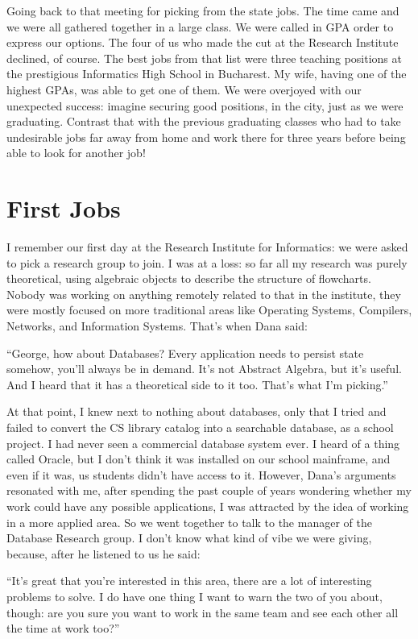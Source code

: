 \documentclass[12pt]{book}
\begin{document}
Going back to that meeting for picking from the state jobs. The time
came and we were all gathered together in a large class. We were called
in GPA order to express our options. The four of us who made the cut at
the Research Institute declined, of course. The best jobs from that list
were three teaching positions at the prestigious Informatics High School
in Bucharest. My wife, having one of the highest GPAs, was able to get
one of them. We were overjoyed with our unexpected success: imagine
securing good positions, in the city, just as we were graduating.
Contrast that with the previous graduating classes who had to take
undesirable jobs far away from home and work there for three years
before being able to look for another job!


\section{First Jobs}

I remember our first day at the Research Institute for Informatics: we
were asked to pick a research group to join. I was at a loss: so far all
my research was purely theoretical, using algebraic objects to describe
the structure of flowcharts. Nobody was working on anything remotely
related to that in the institute, they were mostly focused on more
traditional areas like Operating Systems, Compilers, Networks, and
Information Systems. That's when Dana said:

``George, how about Databases? Every application needs to persist state
somehow, you'll always be in demand. It's not Abstract Algebra, but it's
useful. And I heard that it has a theoretical side to it too. That's
what I'm picking.''

At that point, I knew next to nothing about databases, only that I tried
and failed to convert the CS library catalog into a searchable database,
as a school project. I had never seen a commercial database system ever.
I heard of a thing called Oracle, but I don't think it was installed on
our school mainframe, and even if it was, us students didn't have access
to it. However, Dana's arguments resonated with me, after spending the
past couple of years wondering whether my work could have any possible
applications, I was attracted by the idea of working in a more applied
area. So we went together to talk to the manager of the Database
Research group. I don't know what kind of vibe we were giving, because,
after he listened to us he said:

``It's great that you're interested in this area, there are a lot of
interesting problems to solve. I do have one thing I want to warn the
two of you about, though: are you sure you want to work in the same team
and see each other all the time at work too?''
\end{document}
